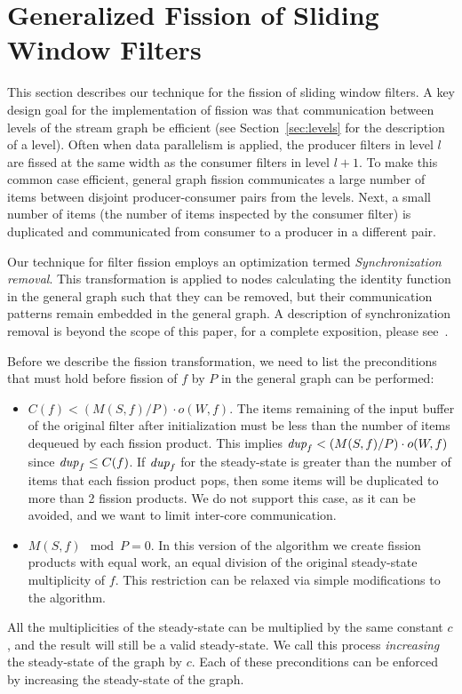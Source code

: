 \section{Generalized Fission of Sliding Window Filters}

This section describes our technique for the fission of sliding window
filters. A key design goal for the implementation of fission 
was that communication between levels of the stream graph be efficient
(see Section~\ref{sec:levels} for the description of a level).  Often
when data parallelism is applied, the producer filters in level $l$ are
fissed at the same width as the consumer filters in level $l + 1$.  To
make this common case efficient, general graph fission communicates a
large number of items between disjoint producer-consumer pairs from the
levels.  Next, a small number of items (the number of items inspected by
the consumer filter) is duplicated and communicated from consumer to a
producer in a different pair.  

Our technique for filter fission employs an optimization termed {\it
  Synchronization removal}.  This transformation is applied to
nodes calculating the identity function in the general graph such that
they can be removed, but their communication patterns remain embedded in
the general graph. A description of synchronization removal is beyond
the scope of this paper, for a complete exposition, please
see~\cite{mgordon-phd}.  

Before we describe the fission transformation, we need to list the
preconditions that must hold before fission of $f$ by $P$ in the general
graph can be performed:
\begin{itemize}
\item $C(f) < (M(S,f) / P) \cdot o(W, f)$. The items remaining of
  the input buffer of the original filter after initialization must be
  less than the number of items dequeued by each fission product.
  This implies $\mbox{\it dup}_f < (M(S,f) / P) \cdot o(W, f)$ since
  $\mbox{\it dup}_f \le C(f)$.  If $\mbox{\it dup}_f$ for the steady-state is greater
  than the number of items that each fission product pops, then some
  items will be duplicated to more than 2 fission products.  We do not
  support this case, as it can be avoided, and we want to limit
  inter-core communication.

\item $M(S,f) \mod P = 0$. In this version of the algorithm we create
  fission products with equal work, an equal division of the original
  steady-state multiplicity of $f$.  This restriction can be relaxed
  via simple modifications to the algorithm.
\end{itemize}
\noindent All the multiplicities of the steady-state can be multiplied
by the same constant $c$, and the result will still be a valid
steady-state.  We call this process {\it increasing} the steady-state
of the graph by $c$.  Each of these preconditions can be enforced by
increasing the steady-state of the graph.


